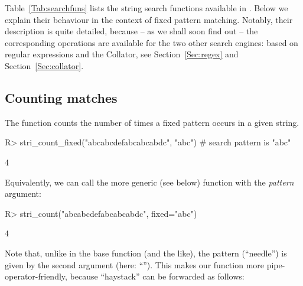 \documentclass[nojss]{jss}
\begin{document}
Table~\ref{Tab:searchfuns} lists the string search functions available
in .  Below we explain their behaviour in the context of fixed
 pattern matching. Notably, their description
is quite detailed, because -- as we shall soon find out --
the corresponding operations are available for the two other search
engines: based on regular expressions and the  Collator,
see Section~\ref{Sec:regex} and Section~\ref{Sec:collator}.






\subsection{Counting matches}

The  function counts the number of
times a fixed pattern occurs in a given string.

\begin{Schunk}
\begin{Sinput}
R> stri_count_fixed("abcabcdefabcabcabdc", "abc")  # search pattern is "abc"
\end{Sinput}
\begin{Soutput}
[1] 4
\end{Soutput}
\end{Schunk}

\ifnotJSSversion
Equivalently, we can call the more generic (see below)
function  with  the \textit{pattern} argument:

\begin{Schunk}
\begin{Sinput}
R> stri_count("abcabcdefabcabcabdc", fixed="abc")
\end{Sinput}
\begin{Soutput}
[1] 4
\end{Soutput}
\end{Schunk}
\fi


\ifnotJSSversion
Note that, unlike in the base   function
(and the like), the pattern (``needle'') is given by the second argument
(here: ``''). This makes our function more
pipe-operator-friendly, because ``haystack'' can be forwarded as follows:
\end{document}
